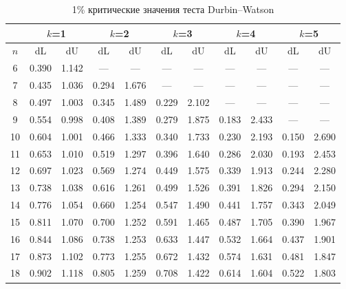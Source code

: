 \documentclass[12pt]{article}
\begin{document}
\begin{table}
\caption{1\% критические значения теста Durbin--Watson}
\begin{center}
{\footnotesize
\begin{tabular}{|c|c|c|c|c|c|c|c|c|c|c|}
  \hline
& \multicolumn{2}{c|}{$k$=1} & \multicolumn{2}{c|}{$k$=2}&
\multicolumn{2}{c|}{$k$=3} & \multicolumn{2}{c|}{$k$=4} &
\multicolumn{2}{c|}{$k$=5} \\ \hline

$n$ & dL& dU& dL &dU & dL &dU &dL& dU &dL& dU\\ \hline


6&
0.390&1.142&---&---&---&---&---&---&---&---\\

7&0.435&1.036&0.294&1.676&---&---&---&---&---&---\\


8&0.497&1.003&0.345&1.489&
0.229&2.102&---&---&---&---\\

9&0.554&0.998&0.408&1.389&0.279&1.875&
0.183&2.433&---&---\\


10&0.604&1.001&0.466&1.333&0.340&1.733&0.230&2.193&
0.150&2.690\\

11&0.653&1.010&0.519&1.297&0.396&1.640&0.286&2.030&0.193&2.453\\


12&0.697&1.023&0.569&1.274&0.449&1.575&0.339&1.913&0.244&2.280\\

13&0.738&1.038&0.616&
1.261&0.499&1.526&0.391&1.826&0.294&2.150\\

14&0.776&1.054&0.660&1.254&0.547& 1.490&0.441&1.757&
0.343&2.049\\


15&0.811&1.070&0.700&1.252&0.591&1.465&0.487&1.705&0.390&1.967\\

16&0.844&1.086&0.738&1.253&0.633&1.447&0.532&1.664&0.437&
1.901\\


17&0.873&1.102&0.773&1.255&0.672&1.432&0.574&1.631&0.481&1.847\\

18&0.902&1.118&0.805&1.259&0.708&1.422&0.614&1.604&0.522&1.803\\



\end{tabular}}
\end{center}
\end{table}
\end{document}
